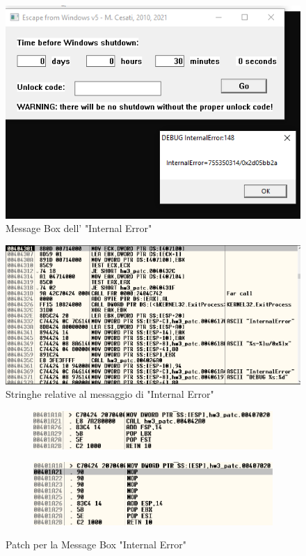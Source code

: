 \documentclass{article}
\begin{document}
\begin{figure}[!h]
\includegraphics[scale=0.5]{immagini/internal_error}
\caption{Message Box dell' "Internal Error"}
\label{Fig5}
\end{figure}

\begin{figure}[!h]
\includegraphics[scale=0.5]{immagini/internal_error_hint}
\caption{Stringhe relative al messaggio di "Internal Error"}
\label{Fig6}
\end{figure}

\vspace{10cm}

\begin{figure}
\begin{subfigure}{0.5\textwidth}
\includegraphics[scale=0.3]{immagini/odbg_3_before}
\end{subfigure}
\begin{subfigure}{0.5\textwidth}
\includegraphics[scale=0.3]{immagini/odbg_3_after}
\end{subfigure}
\caption{Patch per la Message Box "Internal Error"}
\label{Fig7}
\end{figure}
\end{document}
